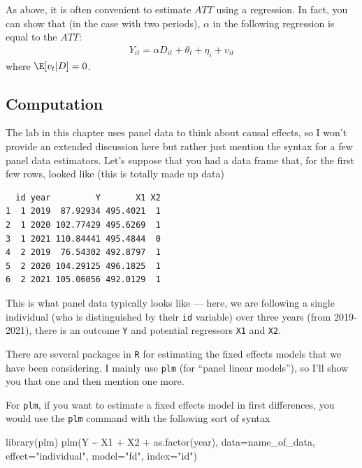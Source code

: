 \documentclass[
  letterpaper,
  DIV=11,
  numbers=noendperiod]{scrreprt}
\newenvironment{Shaded}{\begin{snugshade}}{\end{snugshade}}
\newcommand{\AttributeTok}[1]{\textcolor[rgb]{0.40,0.45,0.13}{#1}}
\newcommand{\FunctionTok}[1]{\textcolor[rgb]{0.28,0.35,0.67}{#1}}
\newcommand{\NormalTok}[1]{\textcolor[rgb]{0.00,0.23,0.31}{#1}}
\newcommand{\SpecialCharTok}[1]{\textcolor[rgb]{0.37,0.37,0.37}{#1}}
\newcommand{\StringTok}[1]{\textcolor[rgb]{0.13,0.47,0.30}{#1}}
\begin{document}
As above, it is often convenient to estimate \(ATT\) using a regression.
In fact, you can show that (in the case with two periods), \(\alpha\) in
the following regression is equal to the \(ATT\): \begin{align*}
  Y_{it} = \alpha D_{it} + \theta_t + \eta_i + v_{it}
\end{align*} where \(\E[v_t | D] = 0\).

\subsection{Computation}\label{computation-11}

The lab in this chapter uses panel data to think about causal effects,
so I won't provide an extended discussion here but rather just mention
the syntax for a few panel data estimators. Let's suppose that you had a
data frame that, for the first few rows, looked like (this is totally
made up data)

\begin{verbatim}
  id year         Y       X1 X2
1  1 2019  87.92934 495.4021  1
2  1 2020 102.77429 495.6269  1
3  1 2021 110.84441 495.4844  0
4  2 2019  76.54302 492.8797  1
5  2 2020 104.29125 496.1825  1
6  2 2021 105.06056 492.0129  1
\end{verbatim}

This is what panel data typically looks like --- here, we are following
a single individual (who is distinguished by their \texttt{id} variable)
over three years (from 2019-2021), there is an outcome \texttt{Y} and
potential regressors \texttt{X1} and \texttt{X2}.

There are several packages in \texttt{R} for estimating the fixed
effects models that we have been considering. I mainly use \texttt{plm}
(for ``panel linear models''), so I'll show you that one and then
mention one more.

For \texttt{plm}, if you want to estimate a fixed effects model in first
differences, you would use the \texttt{plm} command with the following
sort of syntax

\begin{Shaded}
\begin{Highlighting}[]
\FunctionTok{library}\NormalTok{(plm)}
\FunctionTok{plm}\NormalTok{(Y }\SpecialCharTok{\textasciitilde{}}\NormalTok{ X1 }\SpecialCharTok{+}\NormalTok{ X2 }\SpecialCharTok{+} \FunctionTok{as.factor}\NormalTok{(year), }
    \AttributeTok{data=}\NormalTok{name\_of\_data,}
    \AttributeTok{effect=}\StringTok{"individual"}\NormalTok{,}
    \AttributeTok{model=}\StringTok{"fd"}\NormalTok{,}
    \AttributeTok{index=}\StringTok{"id"}\NormalTok{)}
\end{Highlighting}
\end{Shaded}
\end{document}
